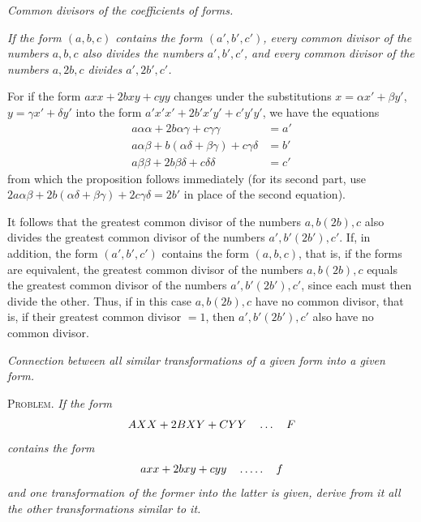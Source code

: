 \begin{center}
\textit{Common divisors of the coefficients of forms.}
\end{center}
\textit{If the form $(a,b,c)$ contains the form $(a',b',c')$, every common divisor of the numbers $a,b,c$ also divides the numbers $a',b',c'$, and every common divisor of the numbers $a,2b,c$ divides $a',2b',c'$.}

For if the form $axx+2bxy+cyy$ changes under the substitutions $x=\alpha x'+\beta y'$, $y=\gamma x'+\delta y'$ into the form $a'x'x'+2b'x'y'+c'y'y'$, we have the equations
\[
\begin{aligned}
a\alpha\alpha+2b\alpha\gamma+c\gamma\gamma&=a'\\
a\alpha\beta+b(\alpha\delta+\beta\gamma)+c\gamma\delta&=b'\\
a\beta\beta+2b\beta\delta+c\delta\delta&=c'
\end{aligned}
\]
from which the proposition follows immediately (for its second part, use $2a\alpha\beta+2b(\alpha\delta+\beta\gamma)+2c\gamma\delta=2b'$ in place of the second equation).

It follows that the greatest common divisor of the numbers $a,b(2b),c$ also divides the greatest common divisor of the numbers $a',b'(2b'),c'$. If, in addition, the form $(a',b',c')$ contains the form $(a,b,c)$, that is, if the forms are equivalent, the greatest common divisor of the numbers $a,b(2b),c$ equals the greatest common divisor of the numbers $a',b'(2b'),c'$, since each must then divide the other. Thus, if in this case $a,b(2b),c$ have no common divisor, that is, if their greatest common divisor $=1$, then $a',b'(2b'),c'$ also have no common divisor.

\begin{center}
\textit{Connection between all similar transformations of a given form into a given form.}
\end{center}
\textsc{Problem.} \textit{If the form}
\[
AXX+2BXY+CYY\quad\mathinner{.\,.\,.}\quad F
\]
\textit{contains the form}
\[
axx+2bxy+cyy\quad\mathinner{.\,.\,.\,.\,.}\quad f
\]
\textit{and one transformation of the former into the latter is given, derive from it all the other transformations similar to it.}

